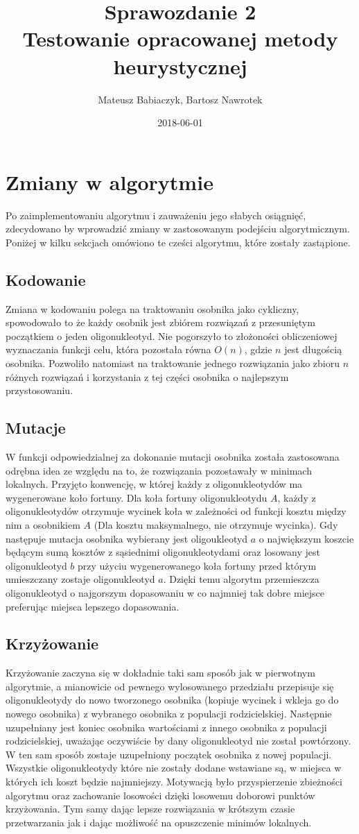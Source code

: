 \documentclass{article}
\title{Sprawozdanie 2 \\ Testowanie opracowanej metody heurystycznej}
\date{2018-06-01}
\author{Mateusz Babiaczyk, Bartosz Nawrotek}
\begin{document}
\maketitle
\section{Zmiany w algorytmie}  
Po zaimplementowaniu algorytmu i zauważeniu jego słabych osiągnięć, zdecydowano by wprowadzić zmiany w zastosowanym podejściu algorytmicznym. Poniżej w kilku sekcjach omówiono te cześci algorytmu, które zostały zastąpione.
\subsection{Kodowanie}
Zmiana w kodowaniu polega na traktowaniu osobnika jako cykliczny, spowodowało to że każdy osobnik jest zbiórem rozwiązań z przesuniętym początkiem o jeden oligonukleotyd. Nie pogorszyło to złożoności obliczeniowej wyznaczania funkcji celu, która pozostała równa $O(n)$, gdzie $n$ jest długością osobnika. Pozwoliło natomiast na traktowanie jednego rozwiązania jako zbioru $n$ różnych rozwiązań i korzystania z tej części osobnika o najlepszym przystosowaniu.
\subsection{Mutacje}
W funkcji odpowiedzialnej za dokonanie mutacji osobnika została zastosowana odrębna idea ze względu na to, że rozwiązania pozostawały w minimach lokalnych. Przyjęto konwencję, w której każdy z oligonukleotydów ma wygenerowane koło fortuny. Dla koła fortuny oligonukleotydu $A$, każdy z oligonukleotydów otrzymuje wycinek koła w zależności od funkcji kosztu między nim a osobnikiem $A$ (Dla kosztu maksymalnego, nie otrzymuje wycinka). Gdy następuje mutacja osobnika wybierany jest oligoukleotyd $a$ o największym koszcie będącym sumą kosztów z sąsiednimi oligonukleotydami oraz losowany jest oligonukleotyd $b$ przy użyciu wygenerowanego koła fortuny przed którym umieszczany zostaje oligonukleotyd $a$. Dzięki temu algorytm przemieszcza oligonukleotyd o najgorszym dopasowaniu w co najmniej tak dobre miejsce preferując miejsca lepszego dopasowania.
\subsection{Krzyżowanie}
Krzyżowanie zaczyna się w dokładnie taki sam sposób jak w pierwotnym algorytmie, a mianowicie od pewnego wylosowanego przedziału przepisuje się oligonukleotydy do nowo tworzonego osobnika (kopiuje wycinek i wkleja go do nowego osobnika) z wybranego osobnika z populacji rodzicielskiej. Następnie uzupełniany jest koniec osobnika wartościami z innego osobnika z populacji rodzicielskiej, uważając oczywiście by dany oligonukleotyd nie został powtórzony. W ten sam sposób zostaje uzupełniony początek osobnika z nowej populacji. \\ Wszystkie oligonukleotydy które nie zostały dodane wstawiane są, w miejsca w których ich koszt będzie najmniejszy. Motywacją było przyspierzenie zbieżności algorytmu oraz zachowanie losowości dzięki losowemu doborowi punktów krzyżowania. Tym samy dając lepsze rozwiązania w krótszym czasie przetwarzania jak i dając możliwość na opuszczenie minimów lokalnych.
\end{document}
